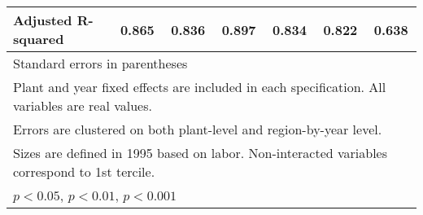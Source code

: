 \begin{table}[htbp]
\begin{tabular}{l*{6}{c}}
Adjusted R-squared&    0.865         &    0.836         &    0.897         &    0.834         &    0.822         &    0.638         \\
\bottomrule
\multicolumn{7}{l}{\footnotesize Standard errors in parentheses}\\
\multicolumn{7}{l}{\footnotesize Plant and year fixed effects are included in each specification. All variables are real values.}\\
\multicolumn{7}{l}{\footnotesize Errors are clustered on both plant-level and region-by-year level.}\\
\multicolumn{7}{l}{\footnotesize Sizes are defined in 1995 based on labor. Non-interacted variables correspond to 1st tercile.}\\
\multicolumn{7}{l}{\footnotesize \sym{*} \(p<0.05\), \sym{**} \(p<0.01\), \sym{***} \(p<0.001\)}\\
\end{tabular}
\end{table}
